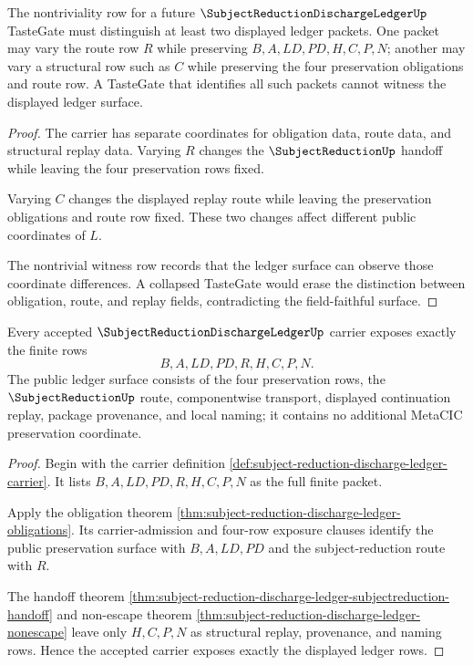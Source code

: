 \begin{theorem}
\label{thm:subject-reduction-discharge-ledger-nontrivial-witness-surface}
The nontriviality row for a future $\SubjectReductionDischargeLedgerUp$ TasteGate must distinguish at least two displayed ledger packets. One packet may vary the route row $R$ while preserving $B,A,LD,PD,H,C,P,N$; another may vary a structural row such as $C$ while preserving the four preservation obligations and route row. A TasteGate that identifies all such packets cannot witness the displayed ledger surface.
\end{theorem}
\begin{proof}
The carrier has separate coordinates for obligation data, route data, and structural replay data. Varying $R$ changes the $\SubjectReductionUp$ handoff while leaving the four preservation rows fixed.

Varying $C$ changes the displayed replay route while leaving the preservation obligations and route row fixed. These two changes affect different public coordinates of $L$.

The nontrivial witness row records that the ledger surface can observe those coordinate differences. A collapsed TasteGate would erase the distinction between obligation, route, and replay fields, contradicting the field-faithful surface.
\end{proof}

\begin{theorem}
\label{thm:subject-reduction-discharge-ledger-carrier-exposure}
Every accepted $\SubjectReductionDischargeLedgerUp$ carrier exposes exactly the finite rows
$$
B,A,LD,PD,R,H,C,P,N.
$$
The public ledger surface consists of the four preservation rows, the $\SubjectReductionUp$ route, componentwise transport, displayed continuation replay, package provenance, and local naming; it contains no additional MetaCIC preservation coordinate.
\end{theorem}
\begin{proof}
Begin with the carrier definition \autoref{def:subject-reduction-discharge-ledger-carrier}. It lists $B,A,LD,PD,R,H,C,P,N$ as the full finite packet.

Apply the obligation theorem \autoref{thm:subject-reduction-discharge-ledger-obligations}. Its carrier-admission and four-row exposure clauses identify the public preservation surface with $B,A,LD,PD$ and the subject-reduction route with $R$.

The handoff theorem \autoref{thm:subject-reduction-discharge-ledger-subjectreduction-handoff} and non-escape theorem \autoref{thm:subject-reduction-discharge-ledger-nonescape} leave only $H,C,P,N$ as structural replay, provenance, and naming rows. Hence the accepted carrier exposes exactly the displayed ledger rows.
\end{proof}

